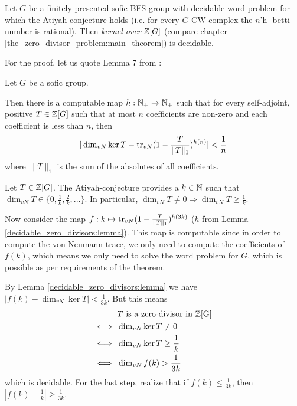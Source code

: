 \begin{Theorem}
	\label{decidable_zero_divisors:theorem}
	Let $G$ be a finitely presented sofic BFS-group with decidable word problem for which the Atiyah-conjecture holds (i.e. for every $G$-CW-complex the $n$'h \ltwo-betti-number is rational).
	Then \emph{kernel-over-$\mathbb{Z}[G]$} (compare chapter \ref{the_zero_divisor_problem:main_theorem}) is decidable.
\end{Theorem}
For the proof, let us quote Lemma 7 from \cite{gra14-2}:
\begin{Lemma}
		\label{decidable_zero_divisors:lemma}
	Let $G$ be a sofic group.

	Then there is a computable map $h: \mathbb{N}_+ \to \mathbb{N}_+$ such that for every self-adjoint, positive $T \in \mathbb{Z}[G]$ such that at most $n$ coefficients are non-zero and each coefficient is less than $n$, then
	\begin{align*}
		| \dim_{vN} \ker T - \operatorname{tr}_{vN}(1 - \frac{T}{\|T\|_1})^{h(n)} | < \frac{1}{n}
	\end{align*}
	where $\|T\|_1$ is the sum of the absolutes of all coefficients.
\end{Lemma}
	Let $T \in \mathbb{Z}[G]$.
	The Atiyah-conjecture provides a $k \in \mathbb{N}$ such that $\dim_{vN} T \in \{0, \frac{1}{k},\frac{2}{k},...\}$. %
	In particular, $\dim_{vN} T \neq 0 \Rightarrow \dim_{vN} T \geq \frac1k$.

	Now consider the map $f:k \mapsto \operatorname{tr}_{vN}(1 - \frac{T}{\|T\|_1})^{h(3k)}$ ($h$ from Lemma \ref{decidable_zero_divisors:lemma}).
	This map is computable since in order to compute the von-Neumann-trace, we only need to compute the coefficients of $f(k)$, which means we only need to solve the word problem for $G$, which is possible as per requirements of the theorem.

	By Lemma \ref{decidable_zero_divisors:lemma} we have $|f(k) - \dim_{vN} \ker T| < \frac{1}{3k}$. But this means
	\begin{align*}
		&T ~\text{is a zero-divisor in \ensuremath{\mathbb{Z}}[G]} \\
		\iff~& \dim_{vN} \ker T \neq 0 \\
		\iff~& \dim_{vN} \ker T \geq \frac1k \\
		\iff~& \dim_{vN} f(k) > \frac{1}{3k}
	\end{align*}
	which is decidable. For the last step, realize that if $f(k) \leq \frac{1}{3k}$, then $|f(k) - \frac1k| \geq \frac{1}{3k}$.
\endproof
